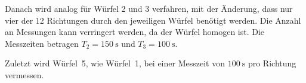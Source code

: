 Danach wird analog für Würfel 2 und 3 verfahren, mit der Änderung,
dass nur vier der 12 Richtungen durch den jeweiligen Würfel benötigt werden.
Die Anzahl an Messungen kann verringert werden, da der Würfel homogen ist.
Die Messzeiten betragen $T_2 = \SI{150}{\second}$ und $T_3 = \SI{100}{\second}$.

Zuletzt wird Würfel~5, wie Würfel~1, bei einer Messzeit von
$\SI{100}{\second}$ pro Richtung vermessen.
